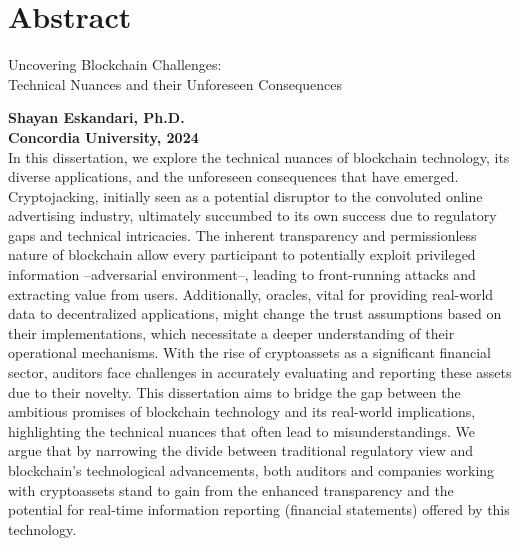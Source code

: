 


\chapter*{\centering Abstract}

\begin{center}
    \Large
    {Uncovering Blockchain Challenges: \\ Technical Nuances and their Unforeseen Consequences}
        
\end{center}

\noindent \textbf{Shayan Eskandari, Ph.D.} \\
\noindent \textbf{Concordia University, 2024} \\

\noindent In this dissertation, we explore the technical nuances of blockchain technology, its diverse applications, and the unforeseen consequences that have emerged. Cryptojacking, initially seen as a potential disruptor to the convoluted online advertising industry, ultimately succumbed to its own success due to regulatory gaps and technical intricacies. The inherent transparency and permissionless nature of blockchain allow every participant to potentially exploit privileged information --adversarial environment--, leading to front-running attacks and extracting value from users. Additionally, oracles, vital for providing real-world data to decentralized applications, might change the trust assumptions based on their implementations, which necessitate a deeper understanding of their operational mechanisms. With the rise of cryptoassets as a significant financial sector, auditors face challenges in accurately evaluating and reporting these assets due to their novelty. This dissertation aims to bridge the gap between the ambitious promises of blockchain technology and its real-world implications, highlighting the technical nuances that often lead to misunderstandings. We argue that by narrowing the divide between traditional regulatory view and blockchain's technological advancements, both auditors and companies working with cryptoassets stand to gain from the enhanced transparency and the potential for real-time information reporting (\eg financial statements) offered by this technology.









